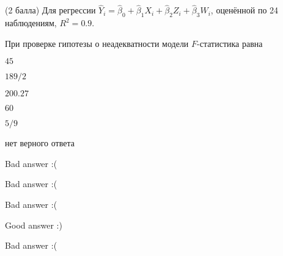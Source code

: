 
\begin{question}
(2 балла) Для регрессии
\(\hat Y_i = \hat\beta_0 + \hat\beta_1 X_i + \hat\beta_2 Z_i + \hat\beta_3 W_i\),
оценённой по 24 наблюдениям, \(R^2=0.9\).

При проверке гипотезы о неадекватности модели \(F\)-статистика равна
\begin{answerlist}
  \item \(45\)
  \item \(189/2\)
  \item \(200.27\)
  \item \(60\)
  \item \(5/9\)
  \item нет верного ответа
\end{answerlist}
\end{question}

\begin{solution}
\begin{answerlist}
  \item Bad answer :(
  \item Bad answer :(
  \item Bad answer :(
  \item Good answer :)
  \item Bad answer :(
\end{answerlist}
\end{solution}

